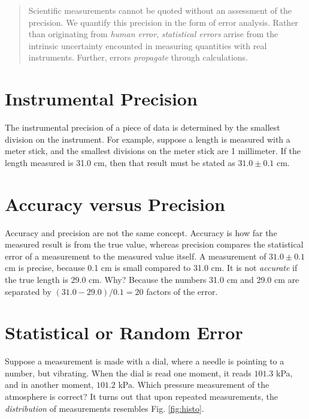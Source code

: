 \documentclass[12pt]{article}
\begin{document}
\maketitle

\begin{abstract}
Scientific measurements cannot be quoted without an assessment of the precision.  We quantify this precision in the form of error analysis.  Rather than originating from \textit{human error}, \textit{statistical errors} arrise from the intrinsic uncertainty encounted in measuring quantities with real instruments.  Further, errors \textit{propagate} through calculations.
\end{abstract}

\section{Instrumental Precision}

The instrumental precision of a piece of data is determined by the smallest division on the instrument.  For example, suppose a length is measured with a meter stick, and the smallest divisions on the meter stick are 1 millimeter.  If the length measured is 31.0 cm, then that result must be stated as $31.0\pm0.1$ cm.

\section{Accuracy versus Precision}

Accuracy and precision are not the same concept.  Accuracy is how far the measured result is from the true value, whereas precision compares the statistical error of a measurement to the measured value itself.  A measurement of $31.0\pm0.1$ cm is precise, because 0.1 cm is small compared to 31.0 cm.  It is not \textit{accurate} if the true length is 29.0 cm.  Why? Because the numbers 31.0 cm and 29.0 cm are separated by $(31.0-29.0)/0.1 = 20$ factors of the error.

\section{Statistical or Random Error}

Suppose a measurement is made with a dial, where a needle is pointing to a number, but vibrating.  When the dial is read one moment, it reads $101.3$ kPa, and in another moment, $101.2$ kPa.  Which pressure measurement of the atmosphere is correct?  It turns out that upon repeated measurements, the \textit{distribution} of measurements resembles Fig. \ref{fig:histo}.
\end{document}
